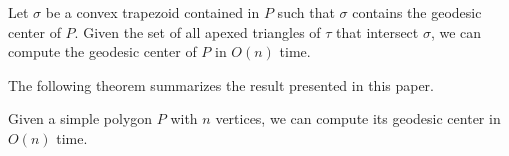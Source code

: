 \documentclass[a4paper,UKenglish]{lipics}
\newcommand{\cell}{\ensuremath{\sigma}}
\begin{document}
\begin{lemma}
Let $\cell$ be a convex trapezoid contained in $P$ such that $\cell$ contains the geodesic center of $P$. Given the set of all apexed triangles of $\tau$ that intersect $\cell$, we can compute the geodesic center of $P$ in $O(n)$ time.
\end{lemma}

The following theorem summarizes the result presented in this paper.

\begin{theorem}
Given a simple polygon $P$ with $n$ vertices, we can compute its geodesic center in $O(n)$ time.
\end{theorem}



\end{document}
